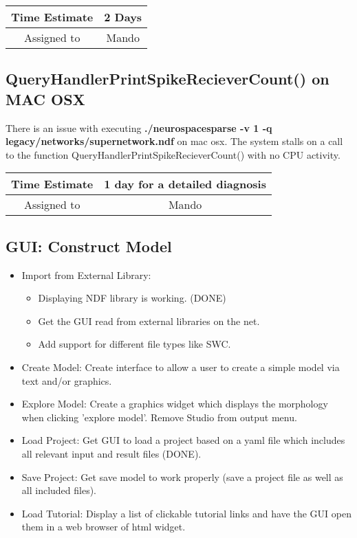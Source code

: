 \documentclass[12pt]{article}
\begin{document}
\begin{center}
  \vspace{5mm}
  \centering
  \begin{tabular}{|c|c|}
    \hline
    Time Estimate
    & 2 Days\\
    \hline
    Assigned to
    & Mando \\
    \hline
  \end{tabular}
\end{center}


\subsection{QueryHandlerPrintSpikeRecieverCount() on MAC OSX}

There is an issue with executing {\bf ./neurospacesparse -v 1 -q
  legacy/networks/supernetwork.ndf} on mac osx. The system stalls on a
call to the function QueryHandlerPrintSpikeRecieverCount() with no CPU
activity.

\begin{center}
  \vspace{5mm}
  \centering
  \begin{tabular}{|c|c|}
    \hline
    Time Estimate
    & 1 day for a detailed diagnosis \\
    \hline
    Assigned to
    & Mando \\
    \hline
  \end{tabular}
\end{center}


\subsection{GUI: Construct Model}

\begin{itemize}
\item Import from External Library:
  \begin{itemize}
  \item Displaying NDF library is working. (DONE)
  \item Get the GUI read from external libraries on the net.
  \item Add support for different file types like SWC.
  \end{itemize}
\item Create Model: Create interface to allow a user to create a
  simple model via text and/or graphics.
\item Explore Model: Create a graphics widget which displays the
  morphology when clicking 'explore model'.  Remove Studio from output
  menu.
\item Load Project: Get GUI to load a project based on a yaml file
  which includes all relevant input and result files (DONE).
\item Save Project: Get save model to work properly (save a project
  file as well as all included files).
\item Load Tutorial: Display a list of clickable tutorial links and
  have the GUI open them in a web browser of html widget.
\end{itemize}
\end{document}
